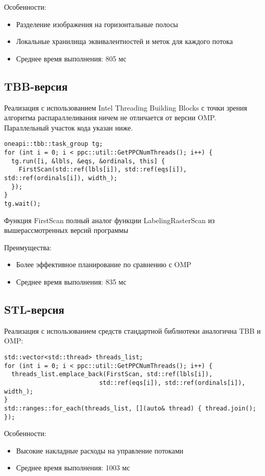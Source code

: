 \documentclass[a4paper,14pt]{article}
\begin{document}
Особенности:
\begin{itemize}
    \item Разделение изображения на горизонтальные полосы
    \item Локальные хранилища эквивалентностей и меток для каждого потока
    \item Среднее время выполнения: 805 мс
\end{itemize}

\subsection{TBB-версия}
Реализация с использованием Intel Threading Building Blocks с точки зрения алгоритма распараллеливания ничем не отличается от версии OMP. Параллельный участок кода указан ниже.

\begin{lstlisting}[caption=Параллельная обработка в TBB]
oneapi::tbb::task_group tg;
for (int i = 0; i < ppc::util::GetPPCNumThreads(); i++) {
  tg.run([i, &lbls, &eqs, &ordinals, this] {
    FirstScan(std::ref(lbls[i]), std::ref(eqs[i]), std::ref(ordinals[i]), width_);
  });
}
tg.wait();
\end{lstlisting}

Функция FirstScan полный аналог функции LabelingRasterScan из вышерассмотренных версий программы

Преимущества:
\begin{itemize}
    \item Более эффективное планирование по сравнению с OMP
    \item Среднее время выполнения: 835 мс
\end{itemize}

\subsection{STL-версия}
Реализация с использованием средств стандартной библиотеки аналогична TBB и OMP:

\begin{lstlisting}[caption=Параллелизация через std::thread]
std::vector<std::thread> threads_list;
for (int i = 0; i < ppc::util::GetPPCNumThreads(); i++) {
  threads_list.emplace_back(FirstScan, std::ref(lbls[i]), 
                          std::ref(eqs[i]), std::ref(ordinals[i]), width_);
}
std::ranges::for_each(threads_list, [](auto& thread) { thread.join(); });
\end{lstlisting}

Особенности:
\begin{itemize}
    \item Высокие накладные расходы на управление потоками
    \item Среднее время выполнения: 1003 мс
\end{itemize}
\end{document}
